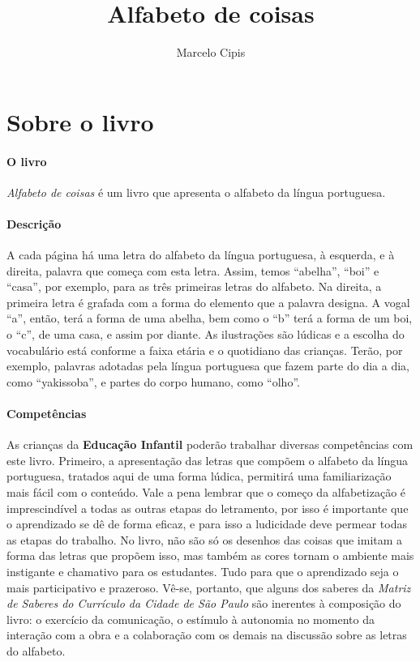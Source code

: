 \documentclass[11pt]{extarticle}
\newcommand{\AutorLivro}{Marcelo Cipis}
\newcommand{\TituloLivro}{Alfabeto de coisas}
\newcommand{\colaborador}{{Paulo Pompermaier e Renier Silva}}
\begin{document}
\title{\TituloLivro}
\author{\AutorLivro}
\def\authornotes{\colaborador}

\date{}
\maketitle


\tableofcontents



\section{Sobre o livro}

\paragraph{O livro} 
\textit{Alfabeto de coisas} é um livro que apresenta o alfabeto da língua portuguesa. 

\paragraph{Descrição} 
A cada página há uma letra do alfabeto da língua portuguesa, à esquerda, e à direita,
palavra que começa com esta letra. Assim, temos ``abelha'', ``boi'' e ``casa'', por exemplo, 
para as três primeiras letras do alfabeto. 
Na direita, a primeira letra é grafada com a forma do elemento que a palavra designa. A vogal ``a'', então, terá
a forma de uma abelha, bem como o ``b'' terá a forma de um boi, o ``c'', de uma casa, e assim por diante. 
As ilustrações são lúdicas e a escolha do vocabulário está conforme a faixa etária
e o quotidiano das crianças. Terão, por exemplo, palavras adotadas pela língua
portuguesa que fazem parte do dia a dia, como ``yakissoba'', e partes do corpo humano, como ``olho''.

\paragraph{Competências} 
As crianças da \textbf{Educação Infantil} poderão trabalhar diversas competências com este livro. Primeiro, a apresentação das letras que compõem o alfabeto da língua portuguesa, tratados aqui de uma forma lúdica, permitirá uma familiarização mais fácil com o conteúdo. Vale a pena lembrar que o começo da alfabetização é imprescindível a todas as outras etapas do letramento, por isso é importante que o aprendizado se dê de forma eficaz, e para isso a ludicidade deve permear todas as etapas do trabalho. No livro, não são só os desenhos das coisas que imitam a forma das letras que propõem isso, mas também as cores tornam o ambiente mais instigante e chamativo para os estudantes. Tudo para que o aprendizado seja o mais participativo e prazeroso. Vê-se, portanto, que alguns dos saberes da \textit{Matriz de Saberes do Currículo da Cidade de São Paulo} são inerentes à composição do livro: o exercício da comunicação, o estímulo à autonomia no momento da interação com a obra e a colaboração com os demais na discussão sobre as letras do alfabeto.
\end{document}
